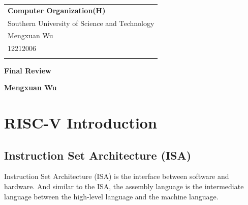\documentclass[a4paper,12pt]{article}
\begin{document}



\thispagestyle{empty} %

\begin{tabular}{p{15.5cm}}
{\large \bf Computer Organization(H)} \\
Southern University of Science and Technology \\ Mengxuan Wu \\ 12212006 \\
\hline
\\
\end{tabular}

\vspace*{0.3cm} %

\begin{center}
	{\Large \bf Final Review}
	\vspace{2mm}

	{\bf Mengxuan Wu}
		
\end{center}  

\vspace{0.4cm}

\section{RISC-V Introduction}

\subsection{Instruction Set Architecture (ISA)}

Instruction Set Architecture (ISA) is the interface between software and hardware. And similar to the ISA, the assembly language is the intermediate language between the high-level language and the machine language. 
\end{document}
